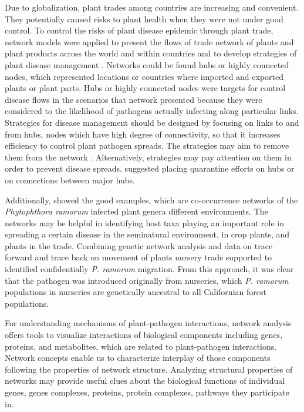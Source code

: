 Due to globalization, plant trades among countries are increasing and convenient. They potentially caused risks to plant health when they were not under good control. To control the risks of plant disease epidemic through plant trade, network models were applied to present the flows of trade network of plants and plant products across the world and within countries and to develop strategies of plant disease management \citep{pautasso2015network}. Networks could be found hubs or highly connected nodes, which represented locations or countries where imported and exported plants or plant parts. Hubs or highly connected nodes were targets for control disease flows in the scenarios that network presented because they were considered to the likelihood of pathogens actually infecting along particular links. Strategies for disease management should be designed by focusing on links to and from hubs, nodes which have high degree of connectivity, so that it increases efficiency to control plant pathogen spreads. The strategies may aim to remove them from the network \citep{Jeger:2007tn,Lefebvre:2011fo}. Alternatively, strategies may pay attention on them in order to prevent disease spreads. \citet{Shaw:2014cka} suggested placing quarantine efforts on hubs or on connections between major hubs.

Additionally, \citet{pautasso2008epidemiological} showed the good examples, which are co-occurrence networks of the \textit{Phytophthora ramorum} infected plant genera different environments. The networks may be helpful in identifying host taxa playing an important role in spreading a certain disease in the seminatural environment, in crop plants, and plants in the trade. Combining genetic network analysis and data on trace forward and trace back on movement of plants nursery trade supported to identified confidentially \textit{P. ramorum} migration. From this approach, it was clear that the pathogen was introduced originally from nurseries, which \textit{P. ramorum} populations in nurseries are genetically ancestral to all Californian forest populations.


For understanding mechanisms of plant-pathogen interactions, network analysis offers tools to visualize interactions of biological components including genes, proteins, and metabolites, which are related to plant-pathogen interactions. Network concepts enable us to characterize interplay of those components following the properties of network structure. Analyzing structural properties of networks may provide useful clues about the biological functions of individual genes, genes complexes, proteins, protein complexes, pathways they participate in.

